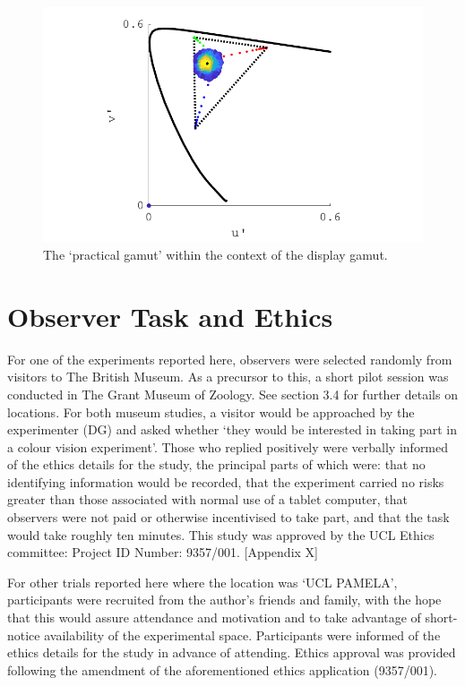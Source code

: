 \begin{figure}[hbp]
\includegraphics[width=\textwidth]{figs/tablet/practical_gamut2.pdf}
\caption{The `practical gamut' within the context of the display gamut.}
\label{fig:practical2}
\end{figure}

\section{Observer Task and Ethics}

For one of the experiments reported here, observers were selected randomly from visitors to The British Museum. As a precursor to this, a short pilot session was conducted in The Grant Museum of Zoology. See section 3.4 for further details on locations.
For both museum studies, a visitor would be approached by the experimenter (DG) and asked whether `they would be interested in taking part in a colour vision experiment'. Those who replied positively were verbally informed of the ethics details for the study, the principal parts of which were: that no identifying information would be recorded, that the experiment carried no risks greater than those associated with normal use of a tablet computer, that observers were not paid or otherwise incentivised to take part, and that the task would take roughly ten minutes. This study was approved by the UCL Ethics committee: Project ID Number: 9357/001. [Appendix X]

For other trials reported here where the location was `UCL PAMELA', participants were recruited from the author's friends and family, with the hope that this would assure attendance and motivation and to take advantage of short-notice availability of the experimental space. Participants were informed of the ethics details for the study in advance of attending. Ethics approval was provided following the amendment of the aforementioned ethics application (9357/001).

